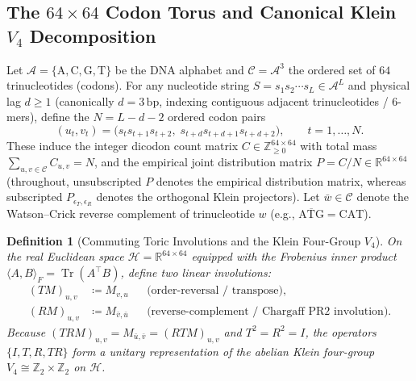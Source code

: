 \documentclass[11pt, a4paper]{article}
\newtheorem{definition}[theorem]{Definition}
\DeclareRobustCommand{\_}{\textunderscore\allowbreak}
\begin{document}
\subsection{The $64 \times 64$ Codon Torus and Canonical Klein $V_4$ Decomposition}

Let $\mathcal{A} = \{\mathrm{A}, \mathrm{C}, \mathrm{G}, \mathrm{T}\}$ be the DNA alphabet and $\mathcal{C} = \mathcal{A}^3$ the ordered set of $64$ trinucleotides (codons). For any nucleotide string $S = s_1 s_2 \cdots s_L \in \mathcal{A}^L$ and physical lag $d \ge 1$ (canonically $d = 3\,\mathrm{bp}$, indexing contiguous adjacent trinucleotides / 6-mers), define the $N = L - d - 2$ ordered codon pairs
\begin{equation}
    (u_t, v_t) = \bigl(s_t s_{t+1} s_{t+2},\; s_{t+d} s_{t+d+1} s_{t+d+2}\bigr), \qquad t = 1, \dots, N.
\end{equation}
These induce the integer dicodon count matrix $C \in \mathbb{Z}_{\ge 0}^{64 \times 64}$ with total mass $\sum_{u,v \in \mathcal{C}} C_{u,v} = N$, and the empirical joint distribution matrix $P = C / N \in \mathbb{R}^{64 \times 64}$ (throughout, unsubscripted $P$ denotes the empirical distribution matrix, whereas subscripted $P_{\epsilon_T,\epsilon_R}$ denotes the orthogonal Klein projectors). Let $\bar{w} \in \mathcal{C}$ denote the Watson--Crick reverse complement of trinucleotide $w$ (e.g., $\overline{\mathrm{ATG}} = \mathrm{CAT}$).

\begin{definition}[Commuting Toric Involutions and the Klein Four-Group $V_4$]
\label{def:v4}
On the real Euclidean space $\mathcal{H} = \mathbb{R}^{64 \times 64}$ equipped with the Frobenius inner product $\langle A, B \rangle_F = \operatorname{Tr}(A^\top B)$, define two linear involutions:
\begin{align}
    (T M)_{u,v} &\coloneqq M_{v,u} && \text{(order-reversal / transpose)}, \\
    (R M)_{u,v} &\coloneqq M_{\bar{v}, \bar{u}} && \text{(reverse-complement / Chargaff PR2 involution)}.
\end{align}
Because $(TR M)_{u,v} = M_{\bar{u},\bar{v}} = (RT M)_{u,v}$ and $T^2 = R^2 = I$, the operators $\{I, T, R, TR\}$ form a unitary representation of the abelian Klein four-group $V_4 \cong \mathbb{Z}_2 \times \mathbb{Z}_2$ on $\mathcal{H}$.
\end{definition}
\end{document}
